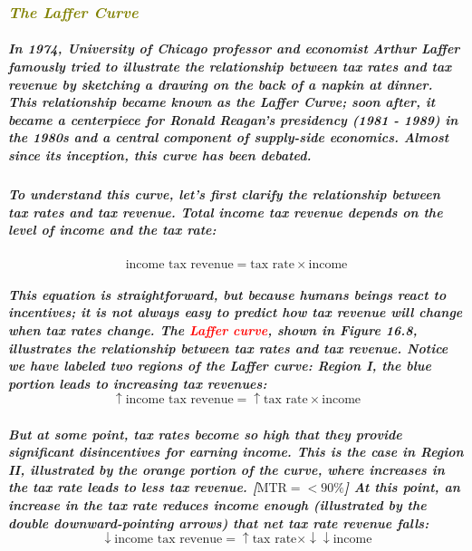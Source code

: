 \documentclass[11pt]{article} %
\begin{document}
\subsubsection*{\textit{\textcolor{olive}{The Laffer Curve}}}
\subparagraph*{In 1974, University of Chicago professor and economist Arthur Laffer famously tried to illustrate the relationship between tax rates and tax revenue by sketching a drawing on the back of a napkin at dinner. This relationship became known as the Laffer Curve; soon after, it became a centerpiece for Ronald Reagan's presidency (1981 - 1989) in the 1980s and a central component of supply-side economics. Almost since its inception, this curve has been debated.}
\subparagraph*{To understand this curve, let's first clarify the relationship between tax rates and tax revenue. Total income tax revenue depends on the level of income and the tax rate:}
\begin{equation}
\text{income tax revenue}=\text{tax rate}\times \text{income}
\end{equation}
\subparagraph*{This equation is straightforward, but because humans beings react to incentives; it is not always easy to predict how tax revenue will change when tax rates change. The \textbf{\textcolor{red}{Laffer curve}}, shown in Figure 16.8, illustrates the relationship between tax rates and tax revenue. Notice we have labeled two regions of the Laffer curve: Region I, the blue portion leads to increasing tax revenues: 
\begin{equation}
\uparrow \text{income tax revenue} = \uparrow \text{tax rate} \times \text{income}
\end{equation}
}
\subparagraph*{But at some point, tax rates become so high that they provide significant disincentives for earning income. This is the case in Region II, illustrated by the orange portion of the curve, where increases in the tax rate leads to less tax revenue. [$\text{MTR}= <90\%$] At this point, an increase in the tax rate reduces income enough (illustrated by the double downward-pointing arrows) that net tax rate revenue falls:
\begin{equation}
\downarrow \text{income tax revenue} = \uparrow \text{tax rate} \times \downarrow\downarrow \text{income}
\end{equation}
}
\end{document}
